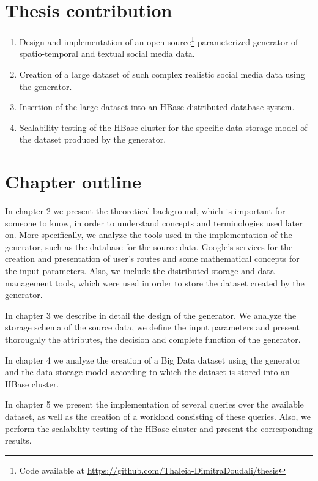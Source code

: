 \section{Thesis contribution}

\begin{enumerate}
  \item Design and implementation of an open source\footnote{Code available at \url{https://github.com/Thaleia-DimitraDoudali/thesis}} parameterized 
  generator of spatio-temporal and textual social media data. 
  \item Creation of a large dataset of such complex realistic social media data using the generator.
  \item Insertion of the large dataset into an HBase distributed database system. 
  \item Scalability testing of the HBase cluster for the specific data storage model of the dataset produced by the generator.
\end{enumerate}

\section{Chapter outline}

In chapter 2 we present the theoretical background, which is important for someone to know, in order to understand concepts and terminologies used later on. 
More specifically, we analyze the tools used in the implementation of the generator, such as the database for the source data,
Google's services for the creation and presentation of user's routes and some mathematical concepts for the input parameters. Also,
we include the distributed storage and data management tools, which were used in order to store the dataset created by the generator. 

In chapter 3 we describe in detail the design of the generator. We analyze the storage schema of the source data, we define the input parameters and 
present thoroughly the attributes, the decision and complete function of the generator. 

In chapter 4 we analyze the creation of a Big Data dataset using the generator and the data storage model according to which the dataset is stored into an 
HBase cluster.

In chapter 5 we present the implementation of several queries over the available dataset, as well as the creation of a workload consisting of these queries. Also, 
we perform the scalability testing of the HBase cluster and present the corresponding results.

